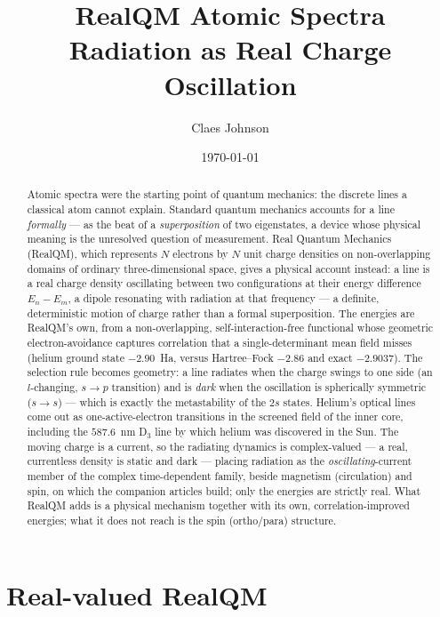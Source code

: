 \documentclass[11pt]{article}
\title{RealQM Atomic Spectra\\
\large Radiation as Real Charge Oscillation}
\author[1]{Claes Johnson}
\affil[1]{KTH Royal Institute of Technology, SE-100 44 Stockholm, Sweden \\
\texttt{claesjohnson@gmail.com}}
\date{\today}
\begin{document}
\maketitle

\begin{abstract}
Atomic spectra were the starting point of quantum mechanics: the discrete lines a classical atom cannot
explain. Standard quantum mechanics accounts for a line \emph{formally} --- as the beat of a
\emph{superposition} of two eigenstates, a device whose physical meaning is the unresolved question of
measurement. Real Quantum Mechanics (RealQM), which represents $N$ electrons by $N$ unit charge densities on
non-overlapping domains of ordinary three-dimensional space, gives a physical account instead: a line is a
real charge density oscillating between two configurations at their energy difference $E_n-E_m$, a dipole
resonating with radiation at that frequency --- a definite, deterministic motion of charge rather than a
formal superposition. The energies are
RealQM's own, from a non-overlapping, self-interaction-free functional whose geometric electron-avoidance
captures correlation that a single-determinant mean field misses (helium ground state $-2.90$~Ha, versus
Hartree--Fock $-2.86$ and exact $-2.9037$). The selection rule becomes geometry: a line radiates when the
charge swings to one side (an $l$-changing, $s\to p$ transition) and is \emph{dark} when the oscillation is
spherically symmetric ($s\to s$) --- which is exactly the metastability of the $2s$ states. Helium's optical
lines come out as one-active-electron transitions in the screened field of the inner core, including the
$587.6$~nm D$_3$ line by which helium was discovered in the Sun. The moving charge is a current, so the
radiating dynamics is complex-valued --- a real, currentless density is static and dark --- placing radiation
as the \emph{oscillating}-current member of the complex time-dependent family, beside magnetism (circulation)
and spin, on which the companion articles build; only the energies are strictly real. What RealQM adds is a
physical mechanism together with its own, correlation-improved energies; what it does not reach is the spin
(ortho/para) structure.
\end{abstract}


\section{Real-valued RealQM}
\label{sec:real}
\end{document}
